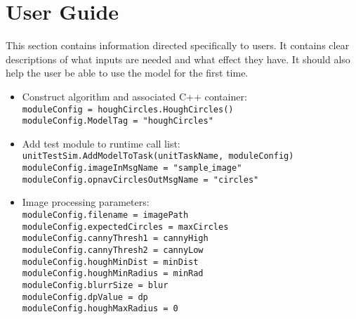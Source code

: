 
\section{User Guide}
This section contains information directed specifically to users. It contains clear descriptions of what inputs are needed and what effect they have. It should also help the user be able to use the model for the first time.

\begin{itemize}
\item Construct algorithm and associated C++ container:\\
\texttt{moduleConfig = houghCircles.HoughCircles()}\\
\texttt{moduleConfig.ModelTag = "houghCircles"}\\
\item Add test module to runtime call list: \\
\texttt{unitTestSim.AddModelToTask(unitTaskName, moduleConfig)}\\
\texttt{moduleConfig.imageInMsgName = "sample$\_$image"}\\
\texttt{moduleConfig.opnavCirclesOutMsgName = "circles"}\\
\item Image processing parameters: \\
\texttt{moduleConfig.filename = imagePath}\\
\texttt{moduleConfig.expectedCircles = maxCircles}\\
\texttt{moduleConfig.cannyThresh1 = cannyHigh}\\
\texttt{moduleConfig.cannyThresh2 = cannyLow}\\
\texttt{moduleConfig.houghMinDist = minDist}\\
\texttt{moduleConfig.houghMinRadius = minRad}\\
\texttt{moduleConfig.blurrSize = blur}\\
\texttt{moduleConfig.dpValue = dp}\\
\texttt{moduleConfig.houghMaxRadius = 0}
\end{itemize}